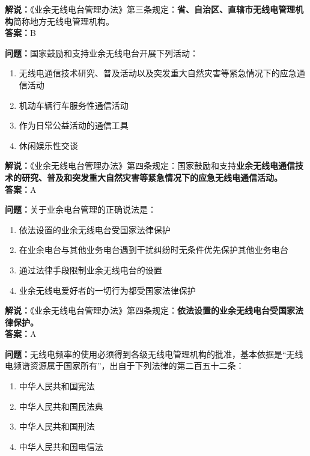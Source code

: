 \documentclass{ctexbook}
\begin{document}
\noindent\textbf{解说：}《业余无线电台管理办法》第三条规定：\textbf{省、自治区、直辖市无线电管理机构}简称地方无线电管理机构。\\\noindent\textbf{答案：}B

\bigskip


\noindent\textbf{问题：}国家鼓励和支持业余无线电台开展下列活动：

\begin{enumerate}[label=\Alph*), leftmargin=3em]
	\item 无线电通信技术研究、普及活动以及突发重大自然灾害等紧急情况下的应急通信活动
	\item 机动车辆行车服务性通信活动
	\item 作为日常公益活动的通信工具
	\item 休闲娱乐性交谈
\end{enumerate}

\noindent\textbf{解说：}《业余无线电台管理办法》第四条规定：国家鼓励和支持\textbf{业余无线电通信技术的研究、普及和突发重大自然灾害等紧急情况下的应急无线电通信活动。}\\\noindent\textbf{答案：}A

\bigskip


\noindent\textbf{问题：}关于业余电台管理的正确说法是：

\begin{enumerate}[label=\Alph*), leftmargin=3em]
	\item 依法设置的业余无线电台受国家法律保护
	\item 在业余电台与其他业务电台遇到干扰纠纷时无条件优先保护其他业务电台
	\item 通过法律手段限制业余无线电台的设置
	\item 业余无线电爱好者的一切行为都受国家法律保护
\end{enumerate}

\noindent\textbf{解说：}《业余无线电台管理办法》第四条规定：\textbf{依法设置的业余无线电台受国家法律保护。}\\\noindent\textbf{答案：}A

\bigskip


\noindent\textbf{问题：}无线电频率的使用必须得到各级无线电管理机构的批准，基本依据是“无线电频谱资源属于国家所有”，出自于下列法律的第二百五十二条： 

\begin{enumerate}[label=\Alph*), leftmargin=3em]
	\item 中华人民共和国宪法
	\item 中华人民共和国民法典
	\item 中华人民共和国刑法
	\item 中华人民共和国电信法
\end{enumerate}
\end{document}
